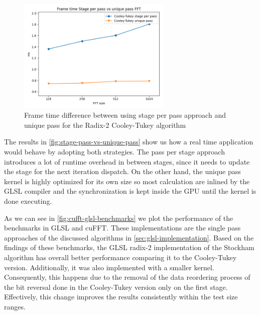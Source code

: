 \documentclass[
  oneside,
  11pt, a4paper,
  footinclude=true,
  headinclude=true,
  cleardoublepage=empty
]{scrbook}
\begin{document}
\begin{figure}[h!] 
    \centering
    \includegraphics[width=0.65\textwidth]{img/results/glsl_stage_pass_vs_unique_pass.png}
    \caption{Frame time difference between using stage per pass approach and unique pass for the Radix-2 Cooley-Tukey algorithm}
    \label{fig:stage-pass-vs-unique-pass}
\end{figure}

The results in \autoref{fig:stage-pass-vs-unique-pass} show us how a real time application would behave by adopting both strategies. The pass per stage approach introduces a lot of runtime overhead in between stages, since it needs to update the stage for the next iteration dispatch. On the other hand, the unique pass kernel is highly optimized for its own size so most calculation are inlined by the GLSL compiler and the synchronization is kept inside the GPU until the kernel is done executing.
\newline


As we can see in \autoref{fig:cufft-glsl-benchmarks} we plot the performance of the benchmarks in GLSL and cuFFT. These implementations are the single pass approaches of the discussed algorithms in \autoref{sec:glsl-implementation}. Based on the findings of these benchmarks, the GLSL radix-2 implementation of the Stockham algorithm has overall better performance comparing it to the Cooley-Tukey version. Additionally, it was also implemented with a smaller kernel. Consequently, this happens due to the removal of the data reordering process of the bit reversal done in the Cooley-Tukey version only on the first stage. Effectively, this change improves the results consistently within the test size ranges.%
\end{document}
